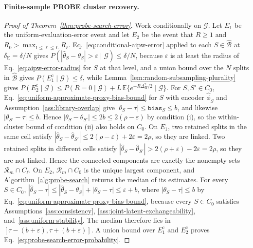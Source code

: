 \paragraph{Finite-sample PROBE cluster recovery.}
\begin{proof}[Proof of Theorem~\ref{thm:probe-search-error}]
Work conditionally on $\mathcal G$. Let $E_1$ be the uniform-evaluation-error event and let $E_2$ be the event that $R\ge1$ and $R_0>\max_{1\le\ell\le L}R_\ell$. Eq.~\eqref{eq:conditional-aipw-error} applied to each $S\in\widehat{\mathcal B}$ at $\delta_{\mathrm E}=\delta/N$ gives $P(|\widehat\theta_S-\theta_S|>\varepsilon\mid\mathcal G)\le\delta/N$, because $\varepsilon$ is at least the radius of Eq.~\eqref{eq:aipw-error-radius} for $S$ at that level, and a union bound over the $N$ splits in $\widehat{\mathcal B}$ gives $P(E_1^{\mathrm c}\mid\mathcal G)\le\delta$, while Lemma~\ref{lem:random-subsampling-plurality} gives $P(E_2^{\mathrm c}\mid\mathcal G)\le P(R=0\mid\mathcal G)+L\,\mathbb E\{e^{-R\Delta_\Pi^2/2}\mid\mathcal G\}$. For $S,S'\in C_0$, Eq.~\eqref{eq:uniform-approximate-proxy-bias-bound} for $S$ with encoder $\widehat\phi_S$ and Assumption~\ref{ass:library-overlap} give $|\theta_S-\tau|\le\mathtt{bias}_S\le b$, and likewise $|\theta_{S'}-\tau|\le b$. Hence $|\theta_S-\theta_{S'}|\le2b\le2(\rho-\varepsilon)$ by condition (i), so the within-cluster bound of condition (ii) also holds on $C_0$. On $E_1$, two retained splits in the same cell satisfy $|\widehat\theta_S-\widehat\theta_{S'}|\le2(\rho-\varepsilon)+2\varepsilon=2\rho$, so they are linked. Two retained splits in different cells satisfy $|\widehat\theta_S-\widehat\theta_{S'}|>2(\rho+\varepsilon)-2\varepsilon=2\rho$, so they are not linked. Hence the connected components are exactly the nonempty sets $\mathcal R_m\cap C_\ell$. On $E_2$, $\mathcal R_m\cap C_0$ is the unique largest component, and Algorithm~\ref{alg:probe-search} returns the median of its estimates. For every $S\in C_0$, $|\widehat\theta_S-\tau|\le|\widehat\theta_S-\theta_S|+|\theta_S-\tau|\le\varepsilon+b$, where $|\theta_S-\tau|\le b$ by Eq.~\eqref{eq:uniform-approximate-proxy-bias-bound}, because every $S\in C_0$ satisfies Assumptions~\ref{ass:consistency}, \ref{ass:joint-latent-exchangeability}, and~\ref{ass:uniform-stability}. The median therefore lies in $[\tau-(b+\varepsilon),\tau+(b+\varepsilon)]$. A union bound over $E_1^{\mathrm c}$ and $E_2^{\mathrm c}$ proves Eq.~\eqref{eq:probe-search-error-probability}.
\end{proof}

